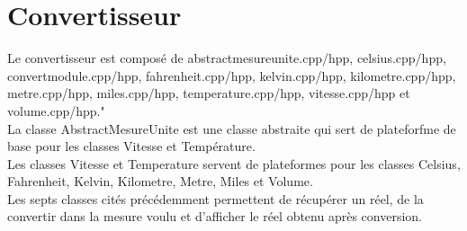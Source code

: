 \documentclass[12pt]{report}
\begin{document}
  \section{Convertisseur}
    Le convertisseur est composé de abstractmesureunite.cpp/hpp, celsius.cpp/hpp, convertmodule.cpp/hpp, fahrenheit.cpp/hpp, kelvin.cpp/hpp, kilometre.cpp/hpp, metre.cpp/hpp, miles.cpp/hpp, temperature.cpp/hpp, vitesse.cpp/hpp et volume.cpp/hpp."\\
    La classe AbstractMesureUnite est une classe abstraite qui sert de plateforfme de base pour les classes Vitesse et Température.\\
    Les classes Vitesse et Temperature servent de plateformes pour les classes Celsius, Fahrenheit, Kelvin, Kilometre, Metre, Miles et Volume.\\
    Les septs classes cités précédemment permettent de récupérer un réel, de la convertir dans la mesure voulu et d'afficher le réel obtenu après conversion.
\end{document}
